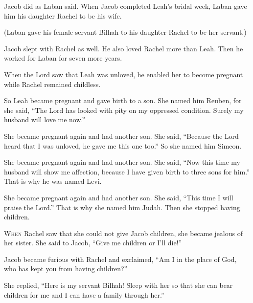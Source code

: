 \begin{scripture}
 Jacob did as Laban said. When Jacob completed Leah's bridal week, Laban gave him his daughter Rachel to be his wife.
 (Laban gave his female servant Bilhah to his daughter Rachel to be her servant.)
 Jacob slept with Rachel as well. He also loved Rachel more than Leah. Then he worked for Laban for seven more years.
\everypar{}

 When the Lord saw that Leah was unloved, he enabled her to become pregnant while Rachel remained childless.
 So Leah became pregnant and gave birth to a son. She named him Reuben, for she said, ``The Lord has looked with pity on my oppressed condition. Surely my husband will love me now.''
\everypar{}

 She became pregnant again and had another son. She said, ``Because the Lord heard that I was unloved, he gave me this one too.'' So she named him Simeon.
\everypar{}

 She became pregnant again and had another son. She said, ``Now this time my husband will show me affection, because I have given birth to three sons for him.'' That is why he was named Levi.
\everypar{}

 She became pregnant again and had another son. She said, ``This time I will praise the Lord.'' That is why she named him Judah. Then she stopped having children.

 \allowchapbreak\hypertarget{ch-genesis-30}{}\lettrine[lines=5]{\color{pentateuch}W}{\textsc{hen}} Rachel saw that she could not give Jacob children, she became jealous of her sister. She said to Jacob, ``Give me children or I'll die!''\everypar{}
 Jacob became furious with Rachel and exclaimed, ``Am I in the place of God, who has kept you from having children?''
 She replied, ``Here is my servant Bilhah! Sleep with her so that she can bear children for me and I can have a family through her.''
\everypar{}


\end{scripture}
